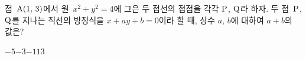 점~$\mathrm{A}(1,\mkern3mu 3)$에서 원~$x^2+y^2=4$에 그은 두 접선의 접점을 각각 $\mathrm{P}$, $\mathrm{Q}$라 하자. 두 점~$\mathrm{P}$, $\mathrm{Q}$를 지나는 직선의 방정식을 $x+ay+b=0$이라 할 때, 상수 $a$, $b$에 대하여 $a+b$의 값은?
\begin{choices32}{$-5$}{$-3$}{$-1$}{$1$}{$3$}\end{choices32}
